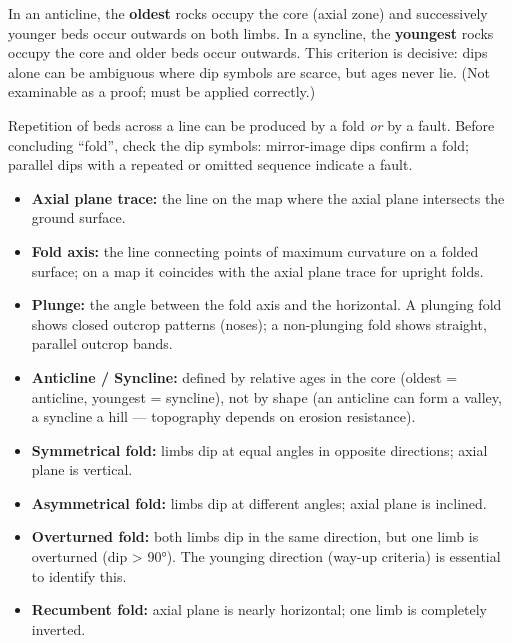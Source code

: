 \documentclass[11pt]{article}
\newcommand{\cle}[1]{{\popxbold\color{popdark}#1}}
\begin{document}
\begin{propriete}
In an \cle{anticline}, the \textbf{oldest} rocks occupy the core (axial zone) and successively younger beds occur outwards on both limbs. In a \cle{syncline}, the \textbf{youngest} rocks occupy the core and older beds occur outwards. This criterion is decisive: dips alone can be ambiguous where dip symbols are scarce, but ages never lie. (Not examinable as a proof; must be applied correctly.)
\end{propriete}

\begin{attention}
Repetition of beds across a line can be produced by a fold \emph{or} by a fault. Before concluding ``fold'', check the dip symbols: mirror-image dips confirm a fold; parallel dips with a repeated or omitted sequence indicate a fault.
\end{attention}

\begin{definition}
\begin{itemize}
\item \textbf{Axial plane trace:} the line on the map where the axial plane intersects the ground surface.
\item \textbf{Fold axis:} the line connecting points of maximum curvature on a folded surface; on a map it coincides with the axial plane trace for upright folds.
\item \textbf{Plunge:} the angle between the fold axis and the horizontal. A plunging fold shows closed outcrop patterns (noses); a non-plunging fold shows straight, parallel outcrop bands.
\item \textbf{Anticline / Syncline:} defined by relative ages in the core (oldest = anticline, youngest = syncline), not by shape (an anticline can form a valley, a syncline a hill — topography depends on erosion resistance).
\item \textbf{Symmetrical fold:} limbs dip at equal angles in opposite directions; axial plane is vertical.
\item \textbf{Asymmetrical fold:} limbs dip at different angles; axial plane is inclined.
\item \textbf{Overturned fold:} both limbs dip in the same direction, but one limb is overturned (dip > 90°). The younging direction (way-up criteria) is essential to identify this.
\item \textbf{Recumbent fold:} axial plane is nearly horizontal; one limb is completely inverted.
\end{itemize}
\end{definition}
\end{document}
